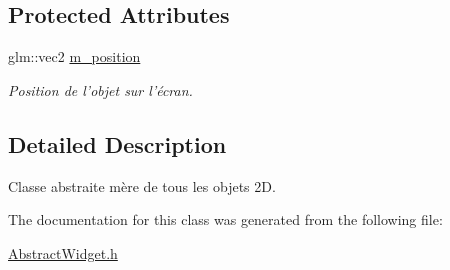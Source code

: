 \subsection*{Protected Attributes}
\begin{DoxyCompactItemize}
\item 
\hypertarget{classAbstractWidget_a847822efcb2b75b9696e1fc9b4ecfa88}{glm\-::vec2 \hyperlink{classAbstractWidget_a847822efcb2b75b9696e1fc9b4ecfa88}{m\-\_\-position}}\label{classAbstractWidget_a847822efcb2b75b9696e1fc9b4ecfa88}

\begin{DoxyCompactList}\small\item\em Position de l'objet sur l'écran. \end{DoxyCompactList}\end{DoxyCompactItemize}


\subsection{Detailed Description}
Classe abstraite mère de tous les objets 2\-D. 

The documentation for this class was generated from the following file\-:\begin{DoxyCompactItemize}
\item 
\hyperlink{AbstractWidget_8h}{Abstract\-Widget.\-h}\end{DoxyCompactItemize}
